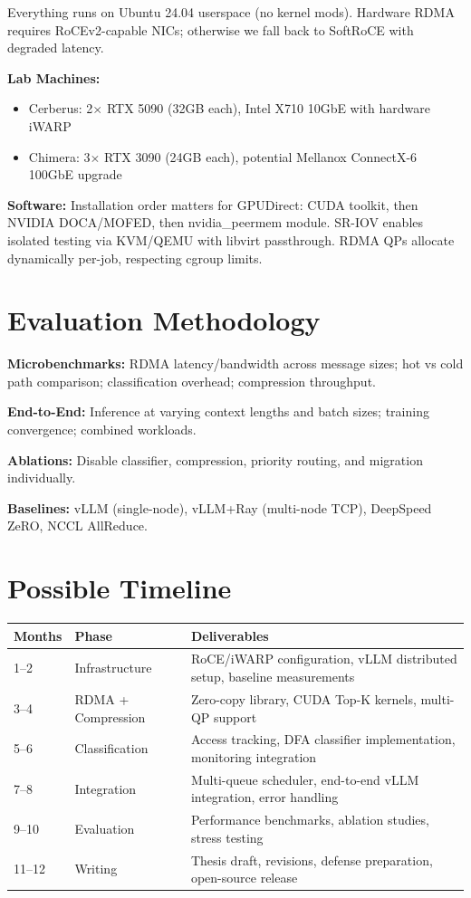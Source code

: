 \documentclass[10pt,letterpaper]{article}
\begin{document}
Everything runs on Ubuntu 24.04 userspace (no kernel mods). Hardware RDMA requires RoCEv2-capable NICs; otherwise we fall back to SoftRoCE with degraded latency.

\textbf{Lab Machines:}
\begin{itemize}[nosep]
\item Cerberus: 2$\times$ RTX 5090 (32GB each), Intel X710 10GbE with hardware iWARP
\item Chimera: 3$\times$ RTX 3090 (24GB each), potential Mellanox ConnectX-6 100GbE upgrade
\end{itemize}

\textbf{Software:} Installation order matters for GPUDirect: CUDA toolkit, then NVIDIA DOCA/MOFED, then nvidia\_peermem module. SR-IOV enables isolated testing via KVM/QEMU with libvirt passthrough. RDMA QPs allocate dynamically per-job, respecting cgroup limits.

\section{Evaluation Methodology}

\textbf{Microbenchmarks:} RDMA latency/bandwidth across message sizes; hot vs cold path comparison; classification overhead; compression throughput.

\textbf{End-to-End:} Inference at varying context lengths and batch sizes; training convergence; combined workloads.

\textbf{Ablations:} Disable classifier, compression, priority routing, and migration individually.

\textbf{Baselines:} vLLM (single-node), vLLM+Ray (multi-node TCP), DeepSpeed ZeRO, NCCL AllReduce.

\section{Possible Timeline}

\begin{table}[h]
\centering
\small
\begin{tabular}{@{}p{1.5cm}p{3cm}p{9.5cm}@{}}
\toprule
\textbf{Months} & \textbf{Phase} & \textbf{Deliverables} \\
\midrule
1--2 & Infrastructure & RoCE/iWARP configuration, vLLM distributed setup, baseline measurements \\
3--4 & RDMA + Compression & Zero-copy library, CUDA Top-K kernels, multi-QP support \\
5--6 & Classification & Access tracking, DFA classifier implementation, monitoring integration \\
7--8 & Integration & Multi-queue scheduler, end-to-end vLLM integration, error handling \\
9--10 & Evaluation & Performance benchmarks, ablation studies, stress testing \\
11--12 & Writing & Thesis draft, revisions, defense preparation, open-source release \\
\bottomrule
\end{tabular}
\end{table}
\end{document}
